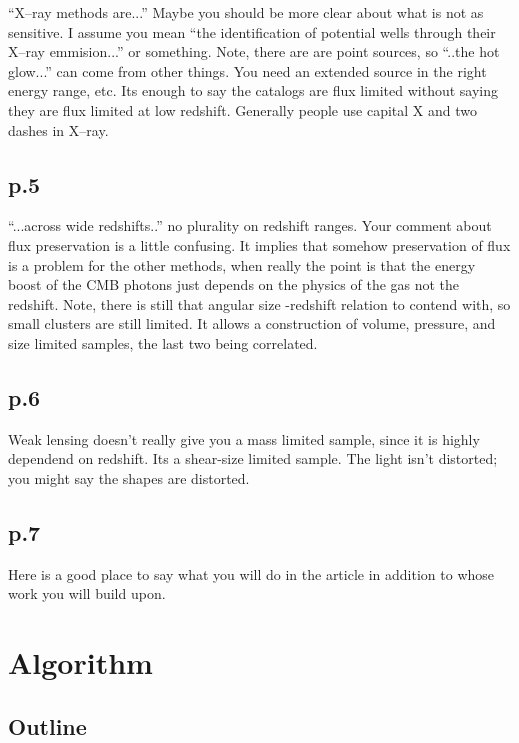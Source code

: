 \documentclass[12pt]{article}
\begin{document}
``X--ray methods are...''  Maybe you should be more clear about what is not as
sensitive.  I assume you mean ``the identification of potential wells through
their X--ray emmision...'' or something.  Note, there are are point sources, so
``..the hot glow...'' can come from other things.  You need an extended source
in the right energy range, etc.  Its enough to say the catalogs are flux
limited without saying they are flux limited at low redshift. Generally people
use capital X and two dashes in X--ray.

\subsection*{p.5}

``...across wide redshifts..'' no plurality on redshift ranges.  Your
comment about flux preservation is a little confusing.  It implies that
somehow preservation of flux is a problem for the other methods, when really
the point is that the energy boost of the CMB photons just depends on the
physics of the gas not the redshift.  Note, there is still that angular
size -redshift relation to contend with, so small clusters are still limited.
It allows a construction of volume, pressure, and size limited samples,
the last two being correlated.

\subsection*{p.6}

Weak lensing doesn't really give you a mass limited sample, since it is highly
dependend on redshift.  Its a shear-size limited sample.  The light isn't
distorted; you might say the shapes are distorted.  

\subsection*{p.7}

Here is a good place to say what you will do in the article in addition
to whose work you will build upon.

\section{Algorithm}

\subsection{Outline}
\end{document}
